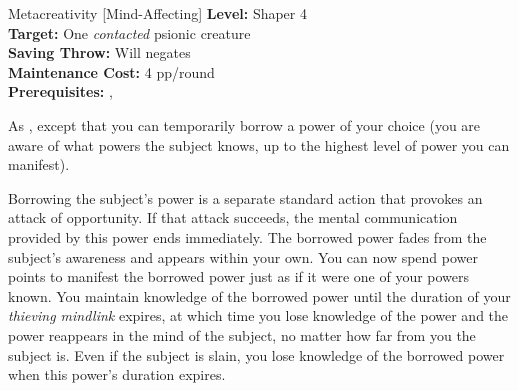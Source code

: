 {Metacreativity [Mind-Affecting]}
{
	\textbf{Level:}
	Shaper 4\\
	\textbf{Target:}
	One \emph{contacted} psionic creature\\
	\textbf{Saving Throw:}
	Will negates\\
	\textbf{Maintenance Cost:}
	4 pp/round\\
	\textbf{Prerequisites:}
	, \\
}
{
	As , except that you can temporarily borrow a power of your choice (you are aware of what powers the subject knows, up to the highest level of power you can manifest).

	Borrowing the subject's power is a separate standard action that provokes an attack of opportunity. If that attack succeeds, the mental communication provided by this power ends immediately. The borrowed power fades from the subject's awareness and appears within your own. You can now spend power points to manifest the borrowed power just as if it were one of your powers known. You maintain knowledge of the borrowed power until the duration of your \emph{thieving mindlink} expires, at which time you lose knowledge of the power and the power reappears in the mind of the subject, no matter how far from you the subject is. Even if the subject is slain, you lose knowledge of the borrowed power when this power's duration expires.
}
